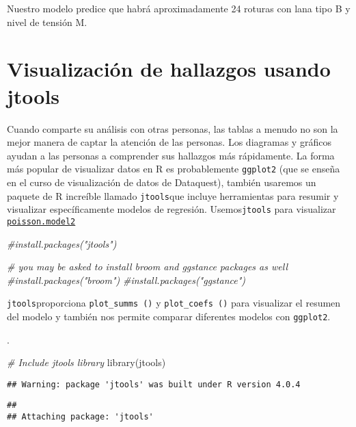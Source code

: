 \documentclass[
]{book}
\newenvironment{Shaded}{\begin{snugshade}}{\end{snugshade}}
\newcommand{\CommentTok}[1]{\textcolor[rgb]{0.56,0.35,0.01}{\textit{#1}}}
\newcommand{\FunctionTok}[1]{\textcolor[rgb]{0.00,0.00,0.00}{#1}}
\newcommand{\NormalTok}[1]{#1}
\begin{document}
Nuestro modelo predice que habrá aproximadamente 24 roturas con lana tipo B y nivel de tensión M.

\hypertarget{visualizaciuxf3n-de-hallazgos-usando-jtools}{%
\chapter{Visualización de hallazgos usando jtools}\label{visualizaciuxf3n-de-hallazgos-usando-jtools}}

Cuando comparte su análisis con otras personas, las tablas a menudo no son la mejor manera de captar la atención de las personas. Los diagramas y gráficos ayudan a las personas a comprender sus hallazgos más rápidamente. La forma más popular de visualizar datos en R es probablemente \texttt{ggplot2} (que se enseña en el curso de visualización de datos de Dataquest), también usaremos un paquete de R increíble llamado \texttt{jtools}que incluye herramientas para resumir y visualizar específicamente modelos de regresión. Usemos\texttt{jtools} para visualizar \underline{\texttt{poisson.model2}}

\begin{Shaded}
\begin{Highlighting}[]
\CommentTok{\#install.packages("jtools")}

\CommentTok{\# you may be asked to install \textquotesingle{}broom\textquotesingle{} and \textquotesingle{}ggstance\textquotesingle{} packages as well}
\CommentTok{\#install.packages("broom")}
\CommentTok{\#install.packages("ggstance")}
\end{Highlighting}
\end{Shaded}

\texttt{jtools}proporciona \texttt{plot\_summs\ ()} y \texttt{plot\_coefs\ ()} para visualizar el resumen del modelo y también nos permite comparar diferentes modelos con \texttt{ggplot2}.

.

\begin{Shaded}
\begin{Highlighting}[]
\CommentTok{\# Include jtools library}
\FunctionTok{library}\NormalTok{(jtools)}
\end{Highlighting}
\end{Shaded}

\begin{verbatim}
## Warning: package 'jtools' was built under R version 4.0.4
\end{verbatim}

\begin{verbatim}
## 
## Attaching package: 'jtools'
\end{verbatim}
\end{document}
